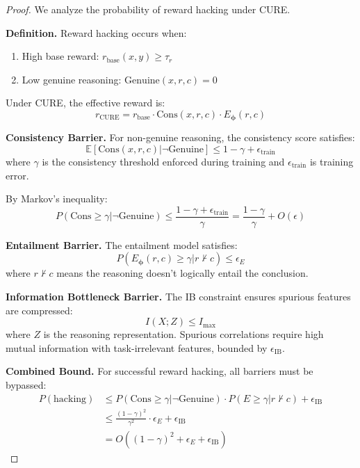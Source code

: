 \documentclass[11pt,a4paper]{article}
\newcommand{\E}{\mathbb{E}}
\newcommand{\bphi}{\bm{\phi}}
\begin{document}
\begin{proof}
We analyze the probability of reward hacking under CURE.

\textbf{Definition.} Reward hacking occurs when:
\begin{enumerate}
    \item High base reward: $r_{\text{base}}(x, y) \geq \tau_r$
    \item Low genuine reasoning: $\text{Genuine}(x, r, c) = 0$
\end{enumerate}

Under CURE, the effective reward is:
\begin{equation}
    r_{\text{CURE}} = r_{\text{base}} \cdot \text{Cons}(x, r, c) \cdot E_\bphi(r, c)
\end{equation}

\textbf{Consistency Barrier.} For non-genuine reasoning, the consistency score satisfies:
\begin{equation}
    \E[\text{Cons}(x, r, c) | \neg\text{Genuine}] \leq 1 - \gamma + \epsilon_{\text{train}}
\end{equation}
where $\gamma$ is the consistency threshold enforced during training and $\epsilon_{\text{train}}$ is training error.

By Markov's inequality:
\begin{equation}
    P(\text{Cons} \geq \gamma | \neg\text{Genuine}) \leq \frac{1 - \gamma + \epsilon_{\text{train}}}{\gamma} = \frac{1-\gamma}{\gamma} + O(\epsilon)
\end{equation}

\textbf{Entailment Barrier.} The entailment model satisfies:
\begin{equation}
    P(E_\bphi(r, c) \geq \gamma | r \not\vdash c) \leq \epsilon_E
\end{equation}
where $r \not\vdash c$ means the reasoning doesn't logically entail the conclusion.

\textbf{Information Bottleneck Barrier.} The IB constraint ensures spurious features are compressed:
\begin{equation}
    I(X; Z) \leq I_{\max}
\end{equation}
where $Z$ is the reasoning representation. Spurious correlations require high mutual information with task-irrelevant features, bounded by $\epsilon_{\text{IB}}$.

\textbf{Combined Bound.} For successful reward hacking, all barriers must be bypassed:
\begin{align}
    P(\text{hacking}) &\leq P(\text{Cons} \geq \gamma | \neg\text{Genuine}) \cdot P(E \geq \gamma | r \not\vdash c) + \epsilon_{\text{IB}} \\
    &\leq \frac{(1-\gamma)^2}{\gamma^2} \cdot \epsilon_E + \epsilon_{\text{IB}} \\
    &= O((1-\gamma)^2 + \epsilon_E + \epsilon_{\text{IB}})
\end{align}
\end{proof}
\end{document}
